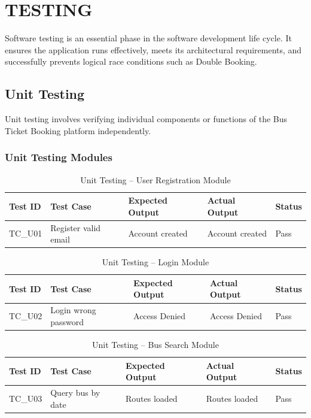 \chapter{TESTING}

Software testing is an essential phase in the software development life cycle. It ensures the application runs effectively, meets its architectural requirements, and successfully prevents logical race conditions such as Double Booking.

\section{Unit Testing}
Unit testing involves verifying individual components or functions of the Bus Ticket Booking platform independently. 

\subsection{Unit Testing Modules}
\begin{table}[H]
\centering
\begin{tabular}{|p{1.5cm}|p{4cm}|p{3.5cm}|p{3.5cm}|p{1.5cm}|}
\hline \textbf{Test ID} & \textbf{Test Case} & \textbf{Expected Output} & \textbf{Actual Output} & \textbf{Status} \\ \hline
TC\_U01 & Register valid email & Account created & Account created & Pass \\ \hline
\end{tabular}
\caption{Unit Testing – User Registration Module}
\end{table}

\begin{table}[H]
\centering
\begin{tabular}{|p{1.5cm}|p{4cm}|p{3.5cm}|p{3.5cm}|p{1.5cm}|}
\hline \textbf{Test ID} & \textbf{Test Case} & \textbf{Expected Output} & \textbf{Actual Output} & \textbf{Status} \\ \hline
TC\_U02 & Login wrong password & Access Denied & Access Denied & Pass \\ \hline
\end{tabular}
\caption{Unit Testing – Login Module}
\end{table}

\begin{table}[H]
\centering
\begin{tabular}{|p{1.5cm}|p{4cm}|p{3.5cm}|p{3.5cm}|p{1.5cm}|}
\hline \textbf{Test ID} & \textbf{Test Case} & \textbf{Expected Output} & \textbf{Actual Output} & \textbf{Status} \\ \hline
TC\_U03 & Query bus by date & Routes loaded & Routes loaded & Pass \\ \hline
\end{tabular}
\caption{Unit Testing – Bus Search Module}
\end{table}


